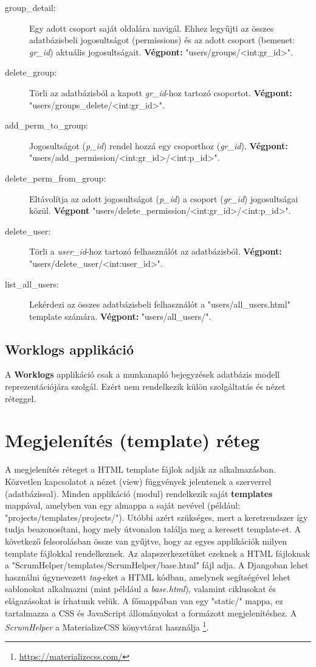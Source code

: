 \begin{itemize}
\begin{description}
		\item[group\_detail:] Egy adott csoport saját oldalára navigál. Ehhez legyűjti az összes adatbázisbeli jogosultságot (permissions) és az adott csoport (bemenet: \textit{gr\_id}) aktuális jogosultságait. \textbf{Végpont:} "users/groups/<int:gr\_id>".
		\item[delete\_group:] Törli az adatbázisból a kapott \textit{gr\_id}-hoz tartozó csoportot. \textbf{Végpont:} "users/groups\_delete/<int:gr\_id>".
		\item[add\_perm\_to\_group:] Jogosultságot (\textit{p\_id}) rendel hozzá egy csoporthoz (\textit{gr\_id}). \textbf{Végpont:} "users/add\_permission/<int:gr\_id>/<int:p\_id>".
		\item[delete\_perm\_from\_group:] Eltávolítja az adott jogosultságot (\textit{p\_id}) a csoport (\textit{gr\_id}) jogosultságai közül. \textbf{Végpont} "users/delete\_permission/<int:gr\_id>/<int:p\_id>".
		\item[delete\_user:] Törli a \textit{user\_id}-hoz tartozó felhasználót az adatbázisból. \textbf{Végpont:} "users/delete\_user/<int:user\_id>".
		\item[list\_all\_users:] Lekérdezi az összes adatbázisbeli felhasználót a "users/all\_users.html" template számára. \textbf{Végpont:} "users/all\_users/".
	\end{description}
\end{itemize}	

\subsection{Worklogs applikáció}

A \textbf{Worklogs} applikáció csak a munkanapló bejegyzések adatbázis modell reprezentációjára szolgál. Ezért nem rendelkezik külön szolgáltatás és nézet réteggel.

\section{Megjelenítés (template) réteg}

A megjelenítés réteget a HTML template fájlok adják az alkalmazásban. Közvetlen kapcsolatot a nézet (view) függvények jelentenek a szerverrel (adatbázissal). Minden applikáció (modul) rendelkezik saját \textbf{templates} mappával, amelyben van egy almappa a saját nevével (például: "projects/templates/projects/"). Utóbbi azért szükséges, mert a keretrendszer így tudja beazonosítani, hogy mely útvonalon találja meg a keresett template-et. A következő felsorolásban össze van gyűjtve, hogy az egyes applikációk milyen template fájlokkal rendelkeznek. Az alapszerkezetüket ezeknek a HTML fájloknak a "ScrumHelper/templates/ScrumHelper/base.html" fájl adja. A Djangoban lehet használni úgynevezett \textit{tag}-eket a HTML kódban, amelynek segítségével lehet sablonokat alkalmazni (mint például a \textit{base.html}), valamint ciklusokat és elágazásokat is írhatunk velük. A főmappában van egy "static/" mappa, ez tartalmazza a CSS és JavaScript állományokat a formázott megjelenítéshez. A \textit{ScrumHelper} a MaterializeCSS könyvtárat használja \footnote{\url{https://materializecss.com/}}.

